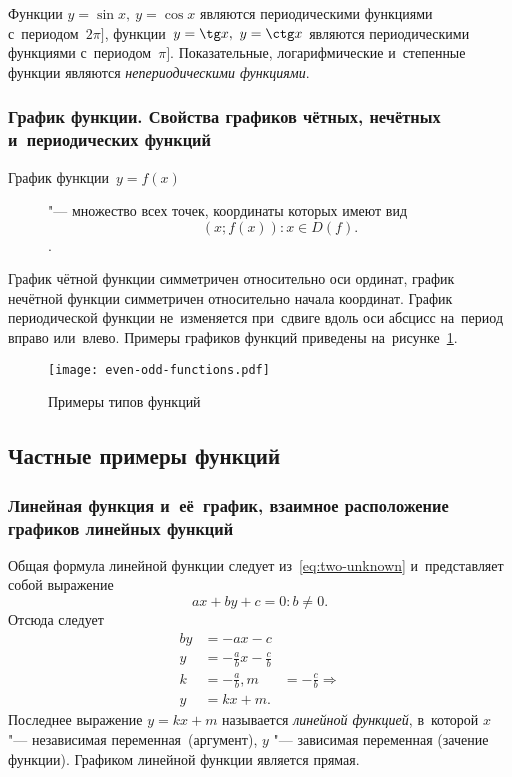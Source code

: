 \documentclass[]{scrartcl}
\begin{document}
Функции ${\textstyle y=\sin x,\ y=\cos x}$ являются периодическими функциями с~периодом~${\textstyle 2\pi]}$, функции~${\textstyle y=\tg x,\ y=\ctg x}$   являются периодическими функциями с~периодом~${\textstyle \pi]}$. Показательные, логарифмические и~степенные функции являются \emph{непериодическими функциями}.

\subsubsection{График функции. Свойства графиков чётных, нечётных и~периодических функций}
\begin{description}
	\item[График функции~${\textstyle y=f(x)}$] "--- множество всех точек, координаты которых имеют вид
	\begin{equation}\label{eq:func-graph-coord}
	(x;f(x)):x\in D(f).
	\end{equation}.
\end{description}
График чётной функции симметричен относительно оси ординат, график нечётной функции симметричен относительно начала координат. График периодической функции не~изменяется при~сдвиге вдоль оси абсцисс на~период вправо или~влево. Примеры графиков функций приведены на~рисунке~\ref{fig:even-odd-functions}.

\begin{figure}[ht]
	\centering %
	\texttt{[image: even-odd-functions.pdf]}
	\caption{Примеры типов функций}\label{fig:even-odd-functions}
\end{figure}

\subsection{Частные примеры функций}
\subsubsection{Линейная функция и~её~график, взаимное расположение графиков линейных функций}

Общая формула линейной функции следует из~\ref{eq:two-unknown} и~представляет собой выражение
\begin{equation}\label{eq:linear-func-1}
ax+by+c=0: b\neq 0.
\end{equation}
Отсюда следует
\begin{equation}\label{eq:linear-func-2}
	\begin{aligned}
		by &= -ax-c\\
		y &= -\frac{a}{b}x - \frac{c}{b}\\
		k &= -\frac{a}{b}, m &= -\frac{c}{b} \Rightarrow \\
		y &= kx+m. 
	\end{aligned}
\end{equation}
Последнее выражение $y=kx+m$ называется \emph{линейной функцией}, в~которой $x$ "--- независимая переменная~(аргумент), $y$ "--- зависимая переменная (зачение функции). Графиком линейной функции является прямая.
\end{document}
